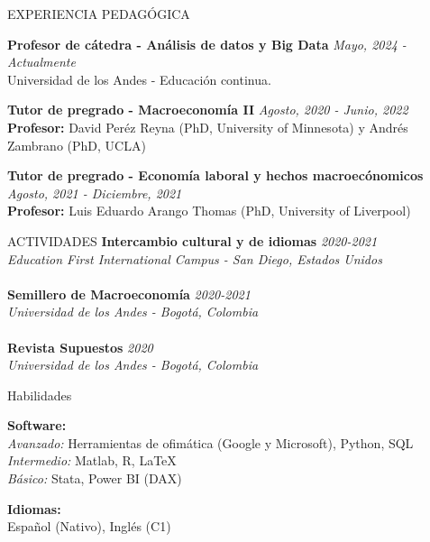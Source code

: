 \documentclass{resume}
\begin{document}
\begin{rSection}{EXPERIENCIA PEDAGÓGICA}

{\bf Profesor de cátedra - Análisis de datos y Big Data} \hfill {\em Mayo, 2024 - Actualmente} 
\\ Universidad de los Andes - Educación continua.


{\bf Tutor de pregrado - Macroeconomía II} \hfill {\em Agosto, 2020 - Junio, 2022} 
\\ \textbf{Profesor:} David Peréz Reyna (PhD, University of Minnesota) y Andrés Zambrano (PhD, UCLA)

{\bf Tutor de pregrado - Economía laboral y hechos macroecónomicos} \hfill {\em Agosto, 2021 - Diciembre, 2021} 
\\ \textbf{Profesor:} Luis Eduardo Arango Thomas (PhD, University of Liverpool)

\end{rSection}

\begin{rSection}{ACTIVIDADES} \itemsep -2pt
{\bf Intercambio cultural y de idiomas} \hfill {\em 2020-2021} 
\\ \textit{Education First International Campus - San Diego, Estados Unidos}
\\
\\
{\bf Semillero de Macroeconomía} \hfill {\em 2020-2021} 
\\ \textit{Universidad de los Andes - Bogotá, Colombia}
\\
\\
{\bf Revista Supuestos} \hfill {\em 2020} 
\\ \textit{Universidad de los Andes - Bogotá, Colombia}

\end{rSection}

\begin{rSection}{Habilidades}

{\bf Software:}\\  \textit{Avanzado:} Herramientas de ofimática (Google y Microsoft), Python, SQL
\\ \textit{Intermedio:} Matlab, R, \LaTeX
\\ \textit{Básico:} Stata, Power BI (DAX)

{\bf Idiomas:} \\ Español (Nativo), Inglés (C1)


\end{rSection}
\end{document}
